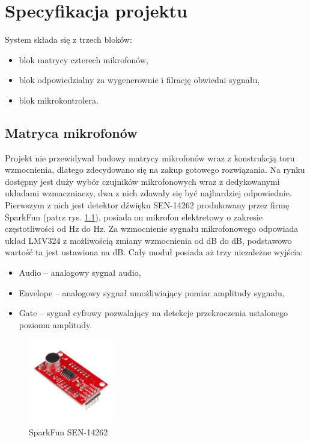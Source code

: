 \documentclass[eng,printmode]{mgr}
\begin{document}
\chapter{Specyfikacja projektu}
System składa się z trzech bloków:
\begin{itemize}
\item blok matrycy czterech mikrofonów,
\item blok odpowiedzialny za wygenerownie i filrację obwiedni sygnału, 
\item blok mikrokontrolera.
\end{itemize}
\section{Matryca mikrofonów}
Projekt nie przewidywał budowy matrycy mikrofonów wraz z konstrukcją toru wzmocnienia, dlatego zdecydowano się na zakup gotowego rozwiązania. Na rynku dostępny jest duży wybór czujników mikrofonowych wraz z dedykowanymi układami wzmaczniaczy, dwa z nich zdawały się być najbardziej odpowiednie.\\
Pierwszym z nich jest detektor dźwięku SEN-14262 produkowany przez firmę SparkFun (patrz rys. \ref{fig-sen}), posiada on mikrofon elektretowy o zakresie częstotliwości od \unit[100]{Hz} do \unit[10000]{Hz}. Za wzmocnienie sygnału mikrofonowego odpowiada układ LMV324 z możliwością zmiany wzmocnienia od \unit[20]{dB} do \unit[60]{dB}, podstawowo wartość ta jest ustawiona na \unit[40]{dB}. Cały moduł posiada aż trzy niezależne wyjścia:
\begin{itemize}
\item Audio -- analogowy sygnał audio,
\item Envelope -- analogowy sygnał umożliwiający pomiar amplitudy sygnału,
\item Gate -- sygnał cyfrowy pozwalający na detekcje przekroczenia ustalonego poziomu amplitudy.
\end{itemize}

\begin{figure}

    \centering

  \includegraphics[width=0.33\textwidth, angle=0]{detektor1.jpg}

    \caption{SparkFun SEN-14262 \cite{sparkfun}}

    \label{fig-sen}

\end{figure}
\end{document}
